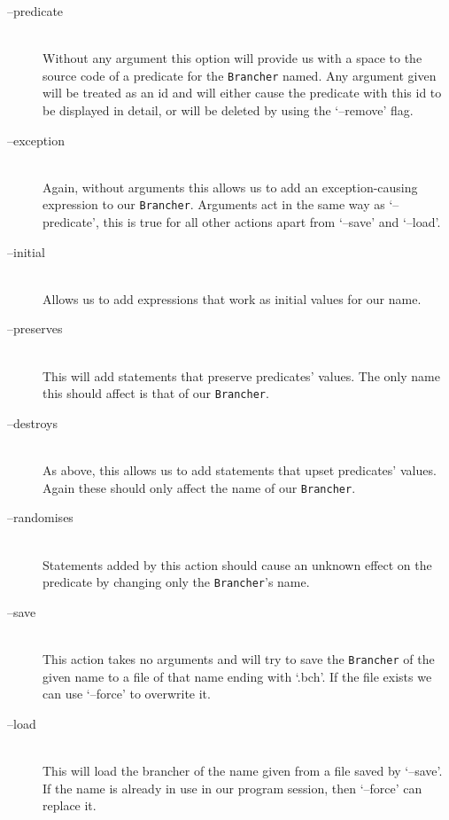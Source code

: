 \documentclass[twoside,a4paper]{report}
\begin{document}
\begin{description}
\item[--predicate] \hfill \\
Without any argument this option will provide us with a space to the source code of a predicate for the \texttt{Brancher} named. Any argument given will be
treated as an id and will either cause the predicate with this id to be displayed in detail, or will be deleted by using the `--remove' flag.

\item[--exception] \hfill \\
Again, without arguments this allows us to add an exception-causing expression to our \texttt{Brancher}. Arguments act in the same way as `--predicate', this is
true for all other actions apart from `--save' and `--load'.

\item[--initial] \hfill \\
Allows us to add expressions that work as initial values for our name.

\item[--preserves] \hfill \\
This will add statements that preserve predicates' values. The only name this should affect is that of our \texttt{Brancher}.

\item[--destroys] \hfill \\
As above, this allows us to add statements that upset predicates' values. Again these should only affect the name of our \texttt{Brancher}.

\item[--randomises] \hfill \\
Statements added by this action should cause an unknown effect on the predicate by changing only the \texttt{Brancher}'s name.

\item[--save] \hfill \\
This action takes no arguments and will try to save the \texttt{Brancher} of the given name to a file of that name ending with `.bch'.
If the file exists we can use `--force' to overwrite it.

\item[--load] \hfill \\
This will load the brancher of the name given from a file saved by `--save'. If the name is already in use in our program session, then `--force'
can replace it.
\end{description}
\end{document}
